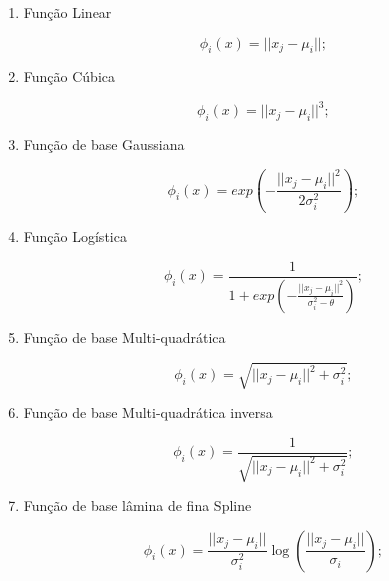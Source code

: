\begin{enumerate}
\item Função Linear

\begin{equation}
\label{eq:rbf_linear_function}
\phi_i(x) = || x_j - \mu_i || ;
\end{equation}

\item Função Cúbica

\begin{equation}
\label{eq:rbf_cubic_function}
\phi_i(x) = || x_j - \mu_i ||^3 ;
\end{equation}

\item Função de base Gaussiana

\begin{equation}
\label{eq:rbf_gaussian_function}
\phi_i(x) = exp \left( - \frac{|| x_j - \mu_i ||^2}{2\sigma_{i}^{2}} \right) ;
\end{equation}

\item Função Logística

\begin{equation}
\label{eq:rbf_logistic_function}
\phi_i(x) = \frac{1}{1 + exp \left( - \frac{|| x_j - \mu_i ||^2}{\sigma_{i}^{2} - \theta} \right)} ;
\end{equation}

\item Função de base Multi-quadrática

\begin{equation}
\label{eq:rbf_multiquadratic_function}
\phi_i(x) = \sqrt{|| x_j - \mu_i ||^2 + \sigma_i^2} ;
\end{equation}

\item Função de base Multi-quadrática inversa

\begin{equation}
\label{eq:rbf_inverse_multiquadratic_function}
\phi_i(x) = \frac{1}{\sqrt{|| x_j - \mu_i ||^2 + \sigma_i^2}} ;
\end{equation}

\item Função de base lâmina de fina Spline

\begin{equation}
\label{eq:rbf_spline}
\phi_i(x) = \frac{|| x_j - \mu_i ||}{\sigma_i^2} \log \left( \frac{|| x_j - \mu_i ||}{\sigma_i} \right) ;
\end{equation}

\end{enumerate}
